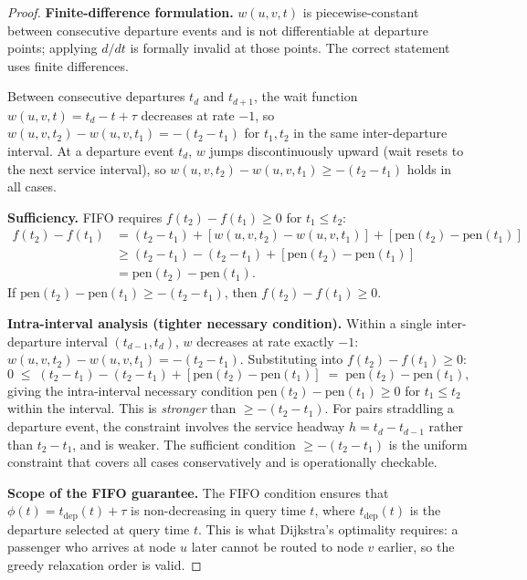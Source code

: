 \documentclass[11pt, a4paper]{article}
\theoremstyle{remark}
\newcommand{\pen}{\mathrm{pen}}
\begin{document}
\begin{proof}
    \textbf{Finite-difference formulation.}
    $w(u,v,t)$ is piecewise-constant between consecutive departure events and
    is not differentiable at departure points; applying $d/dt$ is formally
    invalid at those points. The correct statement uses finite differences.

    Between consecutive departures $t_d$ and $t_{d+1}$, the wait function
    $w(u,v,t) = t_d - t + \tau$ decreases at rate $-1$, so
    $w(u,v,t_2) - w(u,v,t_1) = -(t_2 - t_1)$ for $t_1, t_2$ in the same
    inter-departure interval. At a departure event $t_d$, $w$ jumps
    discontinuously upward (wait resets to the next service interval), so
    $w(u,v,t_2) - w(u,v,t_1) \ge -(t_2 - t_1)$ holds in all cases.

    \textbf{Sufficiency.}
    FIFO requires $f(t_2) - f(t_1) \ge 0$ for $t_1 \le t_2$:
    \begin{align*}
        f(t_2) - f(t_1)
        &= (t_2 - t_1) + [w(u,v,t_2) - w(u,v,t_1)]
           + [\pen(t_2) - \pen(t_1)] \\
        &\ge (t_2 - t_1) - (t_2 - t_1) + [\pen(t_2) - \pen(t_1)] \\
        &= \pen(t_2) - \pen(t_1).
    \end{align*}
    If $\pen(t_2) - \pen(t_1) \ge -(t_2 - t_1)$, then
    $f(t_2) - f(t_1) \ge 0$. \checkmark

    \textbf{Intra-interval analysis (tighter necessary condition).}
    Within a single inter-departure interval $(t_{d-1}, t_d)$, $w$ decreases
    at rate exactly $-1$: $w(u,v,t_2) - w(u,v,t_1) = -(t_2-t_1)$.
    Substituting into $f(t_2) - f(t_1) \ge 0$:
    \[
        0 \;\le\; (t_2-t_1) - (t_2-t_1) + [\pen(t_2)-\pen(t_1)]
          \;=\; \pen(t_2)-\pen(t_1),
    \]
    giving the intra-interval necessary condition
    $\pen(t_2) - \pen(t_1) \ge 0$ for $t_1 \le t_2$ within the interval.
    This is \emph{stronger} than $\ge -(t_2-t_1)$.
    For pairs straddling a departure event, the constraint involves the service
    headway $h = t_d - t_{d-1}$ rather than $t_2 - t_1$, and is weaker.
    The sufficient condition $\ge -(t_2-t_1)$ is the uniform constraint that
    covers all cases conservatively and is operationally checkable. \checkmark

    \textbf{Scope of the FIFO guarantee.}
    The FIFO condition ensures that $\phi(t) = t_{\text{dep}}(t) + \tau$
    is non-decreasing in query time $t$, where $t_{\text{dep}}(t)$ is the
    departure selected at query time $t$. This is what Dijkstra's optimality
    requires: a passenger who arrives at node $u$ later cannot be routed to
    node $v$ earlier, so the greedy relaxation order is valid.


\end{proof}
\end{document}
